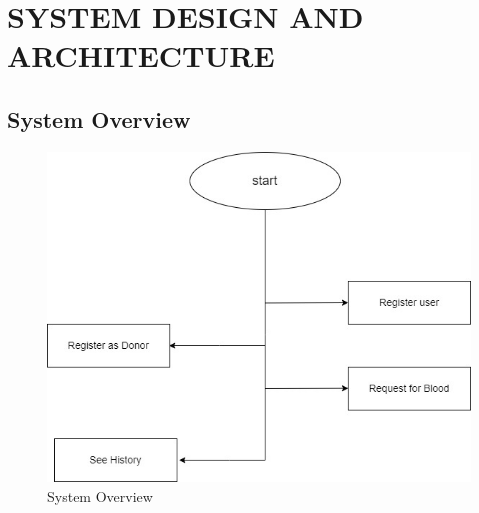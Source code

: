 \section{SYSTEM DESIGN AND ARCHITECTURE}
\vspace{1mm}
\subsection{System Overview}
\begin{figure}[h]
    \centering
    \vspace{2mm}
    \includegraphics[width=120mm]{images/systemoverview.jpg}
    \caption{System Overview}
    \label{fig:System overview}
\end{figure}
\newpage
